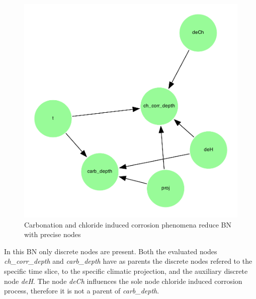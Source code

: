 \begin{figure}[H]
    \centering
    \includegraphics[width=\linewidth]{imgs/pdfs/13_total_rbn_precise.pdf}
    \caption{Carbonation and chloride induced corrosion phenomena reduce BN with precise nodes}\label{fig:precise_rbn}
\end{figure}

In this BN only discrete nodes are present. Both the evaluated nodes  \textit{ch\_corr\_depth} and \textit{carb\_depth} have as parents the discrete nodes refered to the specific time slice, to the specific climatic projection, and the auxiliary discrete node \textit{deH}. The node \textit{deCh} influences the sole node chloride induced corrosion process, therefore it is not a parent of \textit{carb\_depth}.

